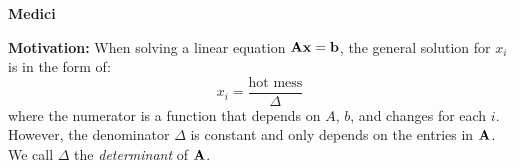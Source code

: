 \documentclass{article}
\begin{document}
    \begin{minipage}[t]{.45\linewidth}
        \begin{center}
            \textbf{Medici}
        \end{center}
        \textbf{Motivation:} When solving a linear equation $\mathbf{Ax}=\mathbf{b}$, the general solution for $x_i$ is in the form of:
        \begin{equation*}
            x_i = \frac{\text{hot mess}}{\Delta}
        \end{equation*}
        where the numerator is a function that depends on $A$, $b$, and changes for each $i$. However, the denominator $\Delta$ is constant and only depends on the entries in $\mathbf{A}$. We call $\Delta$ the \textit{determinant} of $\mathbf{A}$.
        \vspace{2mm}


\end{minipage}
\end{document}
